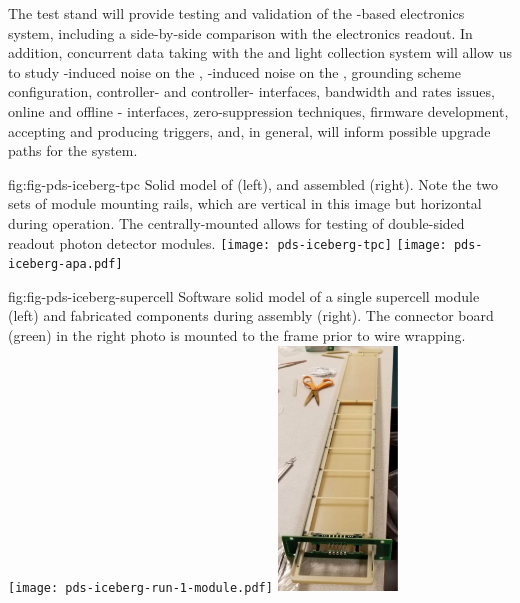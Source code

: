 The test stand will provide testing and validation of the  -based electronics system, including a side-by-side comparison with the   electronics readout. In addition, concurrent data taking with the  and light collection system will allow us to study -induced noise on the , -induced noise on the , grounding scheme configuration, controller- and controller- interfaces, bandwidth and rates issues, online and offline - interfaces, zero-suppression techniques, firmware development, accepting and producing triggers, and, in general, will inform possible upgrade paths for the system. 


\begin{dunefigure}
 {fig:fig-pds-iceberg-tpc}
 {Solid model of   (left), and assembled   (right).  Note the two sets of  module mounting rails, which are vertical in this image but horizontal during operation. The centrally-mounted  allows for testing of double-sided readout photon detector modules.}
\texttt{[image: pds-iceberg-tpc]}
\texttt{[image: pds-iceberg-apa.pdf]}
\end{dunefigure}

\begin{dunefigure}
 {fig:fig-pds-iceberg-supercell}
 {Software solid model of a single supercell   module (left) and fabricated components during assembly (right).  The connector board (green) in the right photo is mounted to the  frame prior to wire wrapping.}
\texttt{[image: pds-iceberg-run-1-module.pdf]}
\includegraphics[angle=0,height=6.5cm]{graphics/pds-iceberg-module-assembly-photo.pdf}
\end{dunefigure}


